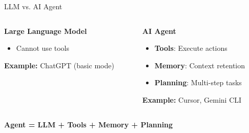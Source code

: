 \documentclass[aspectratio=169]{beamer}
\begin{document}
\begin{frame}{LLM vs. AI Agent}
  \begin{columns}[T]
    \begin{column}{0.48\textwidth}
      \centering
      \large\bfseries
      \textcolor{conesaOrange}{Large Language Model}

      \vspace{0.5cm}
      \normalsize

      \begin{itemize}
        \item Cannot use tools
      \end{itemize}

      \vspace{0.3cm}
      \textbf{Example:} ChatGPT (basic mode)
    \end{column}
    \begin{column}{0.48\textwidth}
      \centering
      \large\bfseries
      \textcolor{conesaTeal}{AI Agent}

      \vspace{0.5cm}
      \normalsize

      \begin{itemize}
        \item \textbf{Tools}: Execute actions
        \item \textbf{Memory}: Context retention
        \item \textbf{Planning}: Multi-step tasks
      \end{itemize}

      \vspace{0.3cm}
      \textbf{Example:} Cursor, Gemini CLI
    \end{column}
  \end{columns}

  \vspace{0.5cm}
  \centering
  \normalsize
  \textbf{Agent = LLM + Tools + Memory + Planning}
\end{frame}
\end{document}
